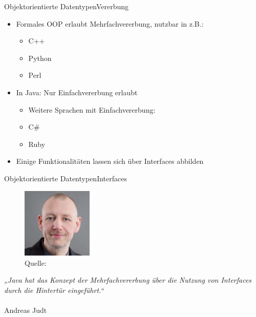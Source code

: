 
\begin{frame}{Objektorientierte Datentypen}{Vererbung}
    \begin{itemize}
        \item Formales OOP erlaubt Mehrfachvererbung, nutzbar in z.B.:
        \begin{itemize}
            \item C++
            \item Python
            \item Perl
        \end{itemize}
        \item In Java: Nur Einfachvererbung erlaubt
        \begin{itemize}
            \item Weitere Sprachen mit Einfachvererbung:
            \item C\#
            \item Ruby
        \end{itemize}
        \item Einige Funktionalitäten lassen sich über Interfaces abbilden
    \end{itemize}
\end{frame}

\begin{frame}{Objektorientierte Datentypen}{Interfaces}
    \begin{minipage}{0.4\textwidth}
            \begin{figure}
                \includegraphics[height=3.35cm]{graph/judt}
                \caption*{Quelle: \cite{pic:judt}}
                \label{fig:ll}
            \end{figure}
        \end{minipage}
        \hfill
        \begin{minipage}{0.55\textwidth}
            \textit{„Java hat das Konzept der Mehrfachvererbung über die Nutzung von Interfaces durch die Hintertür eingeführt.“} \\\\Andreas Judt
        \end{minipage}
\end{frame}

